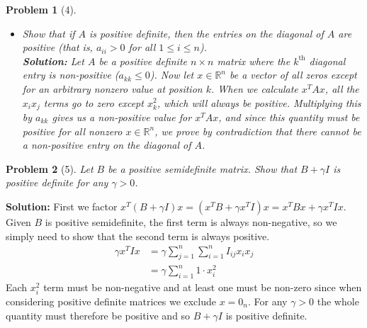 \documentclass[11pt]{article}
\theoremstyle{quest}
\newtheorem*{question}{Problem}
\newcommand{\R}{\mathbb{R}}
\begin{document}
\begin{question}[4]
\begin{itemize}
\item[(b)] Show that if $A$ is positive definite, then the entries on the diagonal of $A$ are positive (that is, $a_{ii} > 0$ for all $1 \leq i \leq n$). \\
\textbf{Solution:}
Let $A$ be a positive definite $n\times n$ matrix where the $k^{\text{th}}$ diagonal entry is non-positive ($a_{kk}\leq 0$). Now let $x\in \R^n$ be a vector of all zeros except for an arbitrary nonzero value at position $k$. When we calculate $x^TAx$, all the $x_ix_j$ terms go to zero except $x_k^2$, which will always be positive. Multiplying this by $a_{kk}$ gives us a non-positive value for $x^TAx$, and since this quantity must be positive for all nonzero $x\in\R^n$, we prove by contradiction that there cannot be a non-positive entry on the diagonal of $A$.
\end{itemize}
\end{question}
\newpage

\begin{question}[5]
Let $B$ be a positive semidefinite matrix. Show that $B + \gamma I$ is positive definite for any $\gamma > 0$.
\end{question}
\vspace{12pt}
\textbf{Solution:}
First we factor $x^T(B+\gamma I)x=(x^TB+\gamma x^TI)x=x^TBx + \gamma x^TIx$. Given $B$ is positive semidefinite, the first term is always non-negative, so we simply need to show that the second term is always positive. \begin{align*}
\gamma x^TIx &= \gamma\sum_{j=1}^n\sum_{i=1}^n I_{ij}x_ix_j\\
&= \gamma\sum_{i=1}^n 1\cdot x_i^2
\end{align*}
Each $x_i^2$ term must be non-negative and at least one must be non-zero since when considering positive definite matrices we exclude $x=0_n$. For any $\gamma > 0$ the whole quantity must therefore be positive and so $B+\gamma I$ is positive definite.
\newpage
\end{document}
